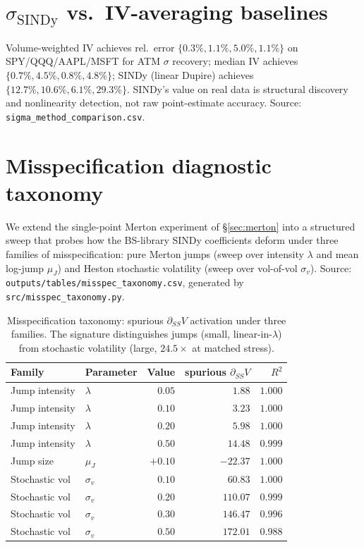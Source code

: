 \documentclass[10pt]{article}
\begin{document}
\section{$\sigma_{\text{SINDy}}$ vs.\ IV-averaging baselines}\label{app:sigma-cmp}
Volume-weighted IV achieves rel.\ error $\{0.3\%, 1.1\%, 5.0\%, 1.1\%\}$ on SPY/QQQ/AAPL/MSFT for ATM $\sigma$ recovery; median IV achieves $\{0.7\%, 4.5\%, 0.8\%, 4.8\%\}$; SINDy (linear Dupire) achieves $\{12.7\%, 10.6\%, 6.1\%, 29.3\%\}$. SINDy's value on real data is structural discovery and nonlinearity detection, not raw point-estimate accuracy. Source: \texttt{sigma\_method\_comparison.csv}.

\section{Misspecification diagnostic taxonomy}\label{app:misspec-taxonomy}

We extend the single-point Merton experiment of \S\ref{sec:merton} into a structured sweep that probes how the BS-library SINDy coefficients deform under three families of misspecification: pure Merton jumps (sweep over intensity $\lambda$ and mean log-jump $\mu_J$) and Heston stochastic volatility (sweep over vol-of-vol $\sigma_v$). Source: \texttt{outputs/tables/misspec\_taxonomy.csv}, generated by \texttt{src/misspec\_taxonomy.py}.

\begin{table}[h]
\centering\footnotesize
\caption{Misspecification taxonomy: spurious $\partial_{SS}V$ activation under three families. The signature distinguishes jumps (small, linear-in-$\lambda$) from stochastic volatility (large, $24.5\times$ at matched stress).}
\label{tab:misspec-taxonomy}
\begin{tabular}{llrrr}
\toprule
Family & Parameter & Value & spurious $\partial_{SS}V$ & $R^2$ \\
\midrule
Jump intensity      & $\lambda$  & $0.05$ & $1.88$   & $1.000$ \\
Jump intensity      & $\lambda$  & $0.10$ & $3.23$   & $1.000$ \\
Jump intensity      & $\lambda$  & $0.20$ & $5.98$   & $1.000$ \\
Jump intensity      & $\lambda$  & $0.50$ & $14.48$  & $0.999$ \\
Jump size           & $\mu_J$    & $+0.10$ & $-22.37$ & $1.000$ \\
Stochastic vol      & $\sigma_v$ & $0.10$ & $60.83$  & $1.000$ \\
Stochastic vol      & $\sigma_v$ & $0.20$ & $110.07$ & $0.999$ \\
Stochastic vol      & $\sigma_v$ & $0.30$ & $\mathbf{146.47}$ & $0.996$ \\
Stochastic vol      & $\sigma_v$ & $0.50$ & $172.01$ & $0.988$ \\
\bottomrule
\end{tabular}
\end{table}
\end{document}
